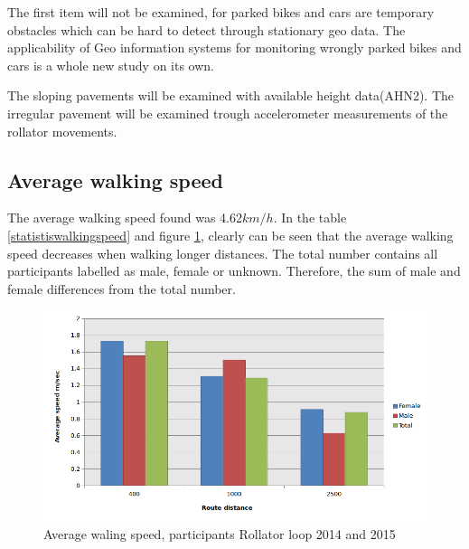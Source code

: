 The first item will not be examined, for parked bikes and cars are temporary obstacles which can be hard to detect through stationary geo data. The applicability of Geo information systems for monitoring wrongly parked bikes and cars is a whole new study on its own.

The sloping pavements will be examined with available height data(AHN2). The irregular pavement will be examined trough accelerometer measurements of the rollator movements. 

\clearpage


\subsection{Average walking speed}
The average walking speed found was 4.62$km/h$. In the table \ref{statistiswalkingspeed} and figure \ref{averagewalkingspeed}, clearly can be seen that the average walking speed decreases when walking longer distances. 
The total number contains all participants labelled as male, female or unknown. Therefore, the sum of male and female differences from the total number.

\begin{figure}[ht]
\includegraphics[width=\textwidth]{img/R_average_walking_speed.png}
\centering
\caption{Average waling speed, participants Rollator loop 2014 and 2015 \label{averagewalkingspeed}}
\end{figure}


